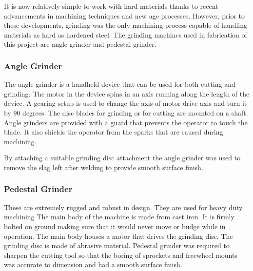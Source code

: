 It is now relatively simple to work with hard materials thanks to recent advancements in machining techniques and new age processes. However, prior to these developments, grinding was the only machining process capable of handling materials as hard as hardened steel. The grinding machines used in fabrication of this project are angle grinder and pedestal grinder.

\subsubsection{Angle Grinder} 

The angle grinder is a handheld device that can be used for both cutting and grinding. The motor in the device spins in an axis running along the length of the device. A gearing setup is used to change the axis of motor drive axis and turn it by 90 degrees. The disc blades for grinding or for cutting are mounted on a shaft. Angle grinders are provided with a guard that prevents the operator to touch the blade. It also shields the operator from the sparks that are caused during machining.

By attaching a suitable grinding disc attachment the angle grinder was used to remove the slag left after welding to provide smooth surface finish.

\subsubsection{Pedestal Grinder}
These are extremely rugged and robust in design. They are used for heavy duty machining The main body of the machine is made from cast iron. It is firmly bolted on ground making sure that it would never move or budge while in operation. The main body houses a motor that drives the grinding disc. The grinding disc is made of abrasive material.
Pedestal grinder was required to sharpen the cutting tool so that the boring of sprockets and freewheel mounts was accurate to dimension and had a smooth surface finish.

